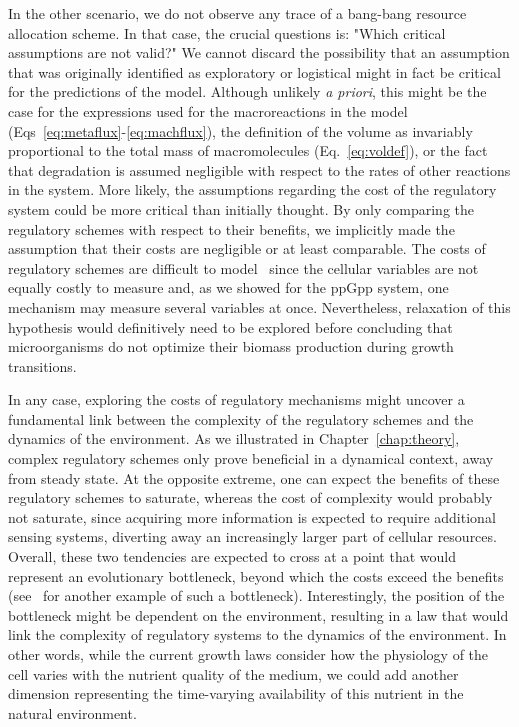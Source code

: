 In the other scenario, we do not observe any trace of a bang-bang resource allocation scheme.
In that case, the crucial questions is: "Which critical assumptions are not valid?"
We cannot discard the possibility that an assumption that was originally identified as exploratory or logistical might in fact be critical for the predictions of the model.
Although unlikely \textit{a priori}, this might be the case for the expressions used for the macroreactions in the model (Eqs~\ref{eq:metaflux}-\ref{eq:machflux}), the definition of the volume as invariably proportional to the total mass of macromolecules (Eq.~\ref{eq:voldef}), or the fact that degradation is assumed negligible with respect to the rates of other reactions in the system.
More likely, the assumptions regarding the cost of the regulatory system could be more critical than initially thought.
By only comparing the regulatory schemes with respect to their benefits, we implicitly made the assumption that their costs are negligible or at least comparable.
The costs of regulatory schemes are difficult to model~\cite{shachrai_cost_2010,dong_gratuitous_1995,
dekel_environmental_2005} since the cellular variables are not equally costly to measure and, as we showed for the ppGpp system, one mechanism may measure several variables at once.
Nevertheless, relaxation of this hypothesis would definitively need to be explored before concluding that microorganisms do not optimize their biomass production during growth transitions.

In any case, exploring the costs of regulatory mechanisms might uncover a fundamental link between the complexity of the regulatory schemes and the dynamics of the environment.
As we illustrated in Chapter~\ref{chap:theory}, complex regulatory schemes only prove beneficial in a dynamical context, away from steady state.
At the opposite extreme, one can expect the benefits of these regulatory schemes to saturate, whereas the cost of complexity would probably not saturate, since acquiring more information is expected to require additional sensing systems, diverting away an increasingly larger part of cellular resources.
Overall, these two tendencies are expected to cross at a point that would represent an evolutionary bottleneck, beyond which the costs exceed the benefits (see~\cite{short_flows_2006} for another example of such a bottleneck).
Interestingly, the position of the bottleneck might be dependent on the environment, resulting in a law that would link the complexity of regulatory systems to the dynamics of the environment.
In other words, while the current growth laws consider how the physiology of the cell varies with the nutrient quality of the medium, we could add another dimension representing the time-varying availability of this nutrient in the natural environment.